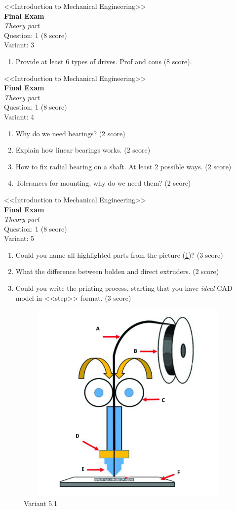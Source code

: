 \documentclass[12pt]{article}
\newcommand\pic[1]{(\cref{#1})} %
\newcommand\ttask[2]{
        \begin{center}
            \LARGE <<Introduction to Mechanical Engineering>> \\ \textbf{Final Exam} \\ \textit{Theory part} \\
            Question: 1 (8 score) \\ Variant: #1
        \end{center}
    #2
    \newpage
    }
\begin{document}
\ttask{3}{
\begin{enumerate}
    \item Provide at least 6 types of drives. Prof and cons (8 score).
\end{enumerate}}

\ttask{4}{
\begin{enumerate}
    \item Why do we need bearings? (2 score)
    \item Explain how linear bearings works. (2 score)
    \item How to fix radial bearing on a shaft. At least 2 possible ways. (2 score)
    \item Tolerances for mounting, why do we need them? (2 score)
\end{enumerate}}

\ttask{5}{
\begin{enumerate}
    \item Could you name all highlighted parts from the picture \pic{fig:resources_THEORY/quiz1_task5.png}? (3 score)
    \item What the difference between bolden and direct extruders. (2 score)
    \item Could you write the printing process, starting that you have \textit{ideal} CAD model in <<step>> format. (3 score)  
\end{enumerate}
\begin{figure}[H]
    \centering\includegraphics[height=10cm,width=1\textwidth,keepaspectratio]{resources_THEORY/quiz1_task5.png}
    \caption{Variant 5.1}
    \label{fig:resources_THEORY/quiz1_task5.png}
\end{figure}}
\end{document}
